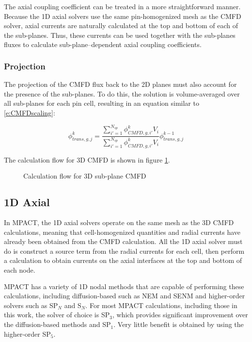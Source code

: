 The axial coupling coefficient can be treated in a more straightforward manner.  Because the 1D axial solvers use the same pin-homogenized mesh as the CMFD solver, axial currents are naturally calculated at the top and bottom of each of the sub-planes.  Thus, these currents can be used together with the sub-planes fluxes to calculate sub-plane--dependent axial coupling coefficients.

\subsubsection{Projection}

The projection of the CMFD flux back to the 2D planes must also account for the presence of the sub-planes.  To do this, the solution is volume-averaged over all sub-planes for each pin cell, resulting in an equation similar to \ref{e:CMFDscaling}:

\begin{equation}
\phi_{trans,g,j}^k = \frac{\sum_{i'=1}^{N_{sp}} \phi_{CMFD,g,i'}^k V_i}{\sum_{i'=1}^{N_{sp}} \phi_{CMFD,g,i'}^k V_i} \phi_{trans,g,j}^{k-1}
\end{equation}

The calculation flow for 3D CMFD is shown in figure \ref{f:CMFD-flowchart}.

\begin{figure}
  \centering
  
  \caption{Calculation flow for 3D sub-plane CMFD}\label{f:CMFD-flowchart}
\end{figure}

\subsection{1D Axial}

In MPACT, the 1D axial solvers operate on the same mesh as the 3D CMFD calculations, meaning that cell-homogenized quantities and radial currents have already been obtained from the CMFD calculation.  All the 1D axial solver must do is construct a source term from the radial currents for each cell, then perform a calculation to obtain currents on the axial interfaces at the top and bottom of each node.

MPACT has a variety of 1D nodal methods that are capable of performing these calculations, including diffusion-based such as NEM and SENM and higher-order solvers such as SP$_N$ and S$_N$.  For most MPACT calculations, including those in this work, the solver of choice is SP$_3$, which provides significant improvement over the diffusion-based methods and SP$_1$.  Very little benefit is obtained by using the higher-order SP$_5$.

